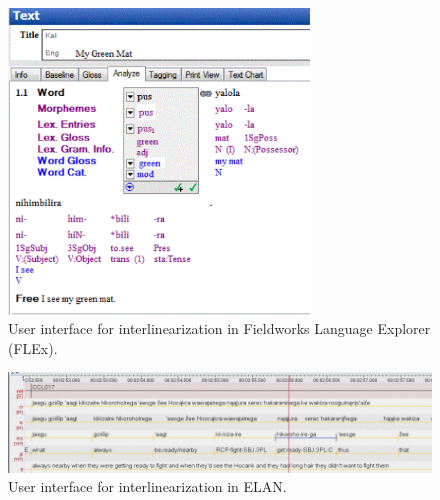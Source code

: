 \begin{figure}
    \centering
    \includegraphics[width=8cm]{figs/FLExIGT.png}
    \caption[FLEx]{User interface for interlinearization in Fieldworks Language Explorer (FLEx).}
    \label{fig:FLEX}
\end{figure}

\begin{figure}
    \centering
    \includegraphics[width=15cm]{figs/ELAN.png}
    \caption[ELAN]{User interface for interlinearization in ELAN.}
    \label{fig:ELAN}
\end{figure}




